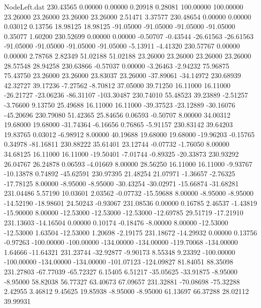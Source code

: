 \begin{filecontents}{NodeLeft.dat}
 230.43565    0.00000    0.00000     0.20918    0.28081  100.00000  100.00000   23.26000   23.26000   23.26000   23.26000    2.51471    3.37577
 230.48654    0.00000    0.00000     0.03012    0.13756   18.98125   18.98125  -91.05000  -91.05000  -91.05000  -91.05000    0.35077    1.60200
 230.52699    0.00000    0.00000    -0.50707   -0.43544  -26.61563  -26.61563  -91.05000  -91.05000  -91.05000  -91.05000   -5.13911   -4.41320
 230.57767    0.00000    0.00000     2.78768    2.82349   51.02188   51.02188   23.26000   23.26000   23.26000   23.26000   28.57548   28.94258
 230.63866   -0.57037    0.00000    -3.26463   -2.94232   75.96875   75.43750   23.26000   23.26000   23.83037   23.26000  -37.89061  -34.14972
 230.68939   42.32727   39.17236    -7.27562   -8.70812   37.05000   39.71250   16.11000   16.11000  -26.21727  -23.06236  -86.31107 -103.30487
 230.74010   55.48523   39.23889    -2.51257   -3.76600    9.13750   25.49688   16.11000   16.11000  -39.37523  -23.12889  -30.16076  -45.20696
 230.79080   51.42365   25.84656     0.06593   -0.50707    8.00000   34.00312   19.68000   19.68000  -31.74364   -6.16656    0.76865   -5.91157
 230.83142   39.64203   19.83765     0.03012   -6.98912    8.00000   40.19688   19.68000   19.68000  -19.96203   -0.15765    0.34978  -81.16811
 230.88222   35.61401   23.12744    -0.07732   -1.76050    8.00000   34.68125   16.11000   16.11000  -19.50401   -7.01744   -0.89325  -20.33873
 230.93292   26.04767   26.24878     0.06593   -4.01669    8.00000   28.56250   16.11000   16.11000   -9.93767  -10.13878    0.74892  -45.62591
 230.97395   21.48254   21.07971    -1.36657   -2.76325  -17.78125    8.00000   -8.95000   -8.95000  -30.43254  -30.02971  -15.66874  -31.68281
 231.04486    5.57190   10.03601     2.03562   -0.07732  -15.59688    8.00000   -8.95000   -8.95000  -14.52190  -18.98601   24.50243   -0.93067
 231.08536    0.00000    0.16785     2.46537   -1.43819  -15.90000    8.00000  -12.53000  -12.53000  -12.53000  -12.69785   29.51719  -17.21910
 231.13603  -14.16504    0.00000     0.10174   -0.18476   -8.00000    8.00000  -12.53000  -12.53000    1.63504  -12.53000    1.20698   -2.19175
 231.18672  -14.29932    0.00000     0.13756   -0.97263 -100.00000 -100.00000 -134.00000 -134.00000 -119.70068 -134.00000    1.64666  -11.64321
 231.23744  -32.92877   -9.90173     8.55348    9.23392 -100.00000 -100.00000 -134.00000 -134.00000 -101.07123 -124.09827   81.84051   88.35098
 231.27803  -67.77039  -65.72327     6.15405    6.51217  -35.05625  -33.91875   -8.95000   -8.95000   58.82038   56.77327   63.40673   67.09657
 231.32881  -70.08698  -75.32288     2.42955    3.46812    9.45625   19.85938   -8.95000   -8.95000   61.13697   66.37288   28.02112   39.99931

\end{filecontents}
